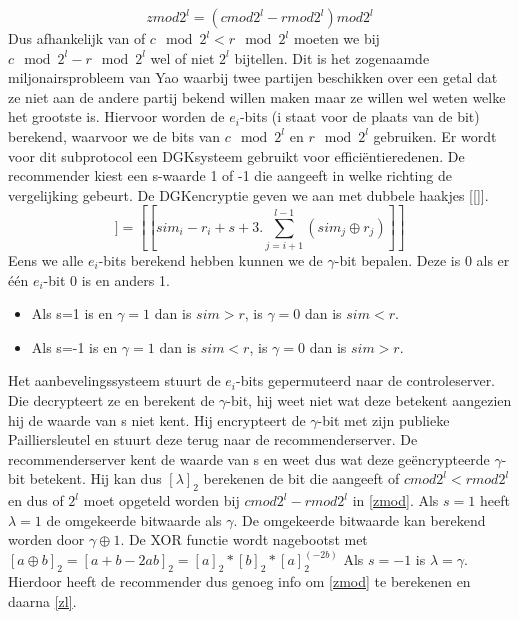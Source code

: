 \begin{equation}
\label{zmod}zmod2^l = (cmod2^l - rmod2^l)mod2^l \end{equation}
Dus afhankelijk van of $c\mod 2^l < r\mod 2^l$ moeten we bij $c\mod 2^l - r\mod 2^l$ wel of niet $2^l$ bijtellen. Dit is het zogenaamde miljonairsprobleem van Yao waarbij twee partijen beschikken over een getal dat ze niet aan de andere partij bekend willen maken maar ze willen wel weten welke het grootste is. Hiervoor worden de $e_i$-bits (i staat voor de plaats van de bit) berekend, waarvoor we de bits van $c \mod2^l$ en $r \mod 2^l$ gebruiken. Er wordt voor dit subprotocol een DGKsysteem gebruikt voor effici\"entieredenen.  De recommender kiest een s-waarde 1 of -1 die aangeeft in welke richting de vergelijking gebeurt. De DGKencryptie geven we aan met dubbele haakjes [[]].
\begin{equation}
[[e_i]]=[[sim_i - r_i + s+ 3.\sum_{j=i+1}^{l-1}(sim_j \oplus r_j)]]
\end{equation}
Eens we alle $e_i$-bits berekend hebben kunnen we de $\gamma$-bit bepalen. Deze is 0 als er één $e_i$-bit 0 is en anders 1.
\begin{itemize}
 
\item Als s=1 is en $\gamma = 1$  dan is $sim > r$, is $\gamma=0$ dan is $sim< r$.
\item  Als s=-1 is en $\gamma = 1$  dan is $sim < r$, is $\gamma=0$ dan is $sim> r$.
\end{itemize}   Het aanbevelingssysteem stuurt de $e_i$-bits gepermuteerd naar de controleserver. Die decrypteert ze en berekent de $\gamma$-bit, hij weet niet wat deze betekent aangezien hij de waarde van s niet kent. Hij encrypteert de $\gamma$-bit met zijn publieke Pailliersleutel en stuurt deze terug naar de recommenderserver. De recommenderserver kent de waarde van s en weet dus wat deze ge\"encrypteerde $\gamma$-bit betekent. Hij kan dus $[\lambda]_2$ berekenen de bit die aangeeft of $cmod2^l < rmod2^l$ en dus of $2^l$ moet opgeteld worden bij $cmod2^l - rmod2^l$ in \ref{zmod}.
Als $s = 1$ heeft  $\lambda=1$ de omgekeerde bitwaarde als $\gamma$. De omgekeerde bitwaarde kan berekend worden door  $\gamma \oplus 1$. De XOR functie wordt nagebootst met $[a \oplus b]_2= [a + b - 2ab]_2 = [a]_2*[b]_2*[a]_2^(-2b)$ Als $s =-1$ is $\lambda = \gamma$. Hierdoor heeft de recommender dus genoeg info om \ref{zmod} te berekenen en daarna \ref{zl}.
